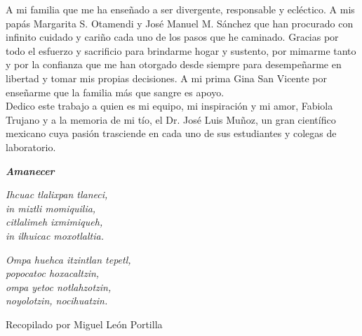 \newpage

A mi familia que me ha enseñado a ser divergente, responsable y ecléctico. A mis papás Margarita S. Otamendi y José Manuel M. Sánchez que han procurado con infinito cuidado y cariño cada uno de los pasos que he caminado. Gracias por todo el esfuerzo y sacrificio para brindarme hogar y sustento, por mimarme tanto y por la confianza que me han otorgado desde siempre para desempeñarme en libertad y tomar mis propias decisiones. A mi prima Gina San Vicente por enseñarme que la familia más que sangre es apoyo.\\

Dedico este trabajo a quien es mi equipo, mi inspiración y mi amor, Fabiola Trujano y a la memoria de mi tío, el Dr. José Luis Muñoz, un gran científico mexicano cuya pasión trasciende en cada uno de sus estudiantes y colegas de laboratorio.\\

\vspace{40mm} 

\begin{center}

\textbf{\textit{Amanecer}}\\
\vspace{2mm} 


\textit{Ihcuac tlalixpan tlaneci,}\\
\textit{in miztli momiquilia,}\\
\textit{citlalimeh ixmimiqueh,}\\
\textit{in ilhuicac moxotlaltia.}\\

\vspace{2mm} 

\textit{Ompa huehca itzintlan tepetl,}\\
\textit{popocatoc hoxacaltzin,}\\
\textit{ompa yetoc notlahzotzin,}\\
\textit{noyolotzin, nocihuatzin.}\\

\vspace{2mm}

Recopilado por Miguel León Portilla 

\end{center}